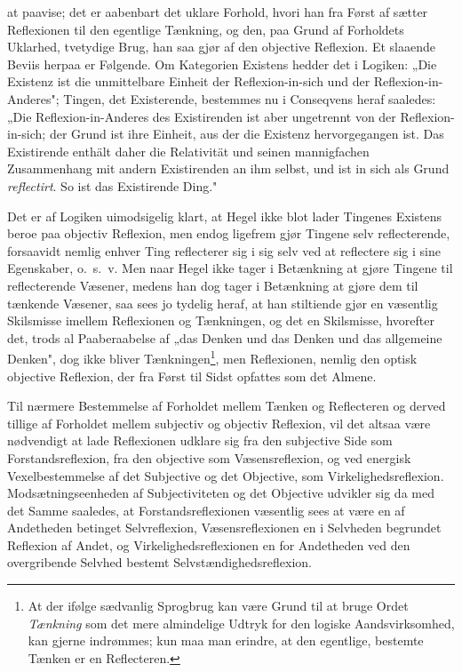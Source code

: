 \documentclass[12pt]{book}
\newcommand{\opage}[1]{\marginnote{\footnotesize\textit{[#1]}}}
\begin{document}
at paavise; det er aabenbart det uklare Forhold, hvori han fra Først af sætter
Reflexionen til den egentlige Tænkning, og den, paa Grund af Forholdets Uklarhed,
tvetydige Brug, han saa gjør af den objective Reflexion. Et slaaende Beviis herpaa
er Følgende. Om Kategorien Existens hedder det
\opage{59} i Logiken: „Die Existenz ist die unmittelbare Einheit der Reflexion-in-sich und
der Reflexion-in-Anderes"; Tingen, det Existerende, bestemmes nu i Conseqvens
heraf saaledes: „Die Reflexion-in-Anderes des Existirenden ist aber ungetrennt von
der Reflexion-in-sich; der Grund ist ihre Einheit, aus der die Existenz
hervorgegangen ist. Das Existirende enthält daher die Relativität und seinen
mannigfachen Zusammenhang mit andern Existirenden an ihm selbst, und ist in sich
als Grund \emph{reflectirt}. So ist das Existirende Ding."

Det er af Logiken uimodsigelig klart, at Hegel ikke blot lader Tingenes Existens
beroe paa objectiv Reflexion, men endog ligefrem gjør Tingene selv reflecterende,
forsaavidt nemlig enhver Ting reflecterer sig i sig selv ved at reflectere sig i
sine Egenskaber, o.~s.~v. Men naar Hegel ikke tager i Betænkning at gjøre Tingene
til reflecterende Væsener, medens han dog tager i Betænkning at gjøre dem til
tænkende Væsener, saa sees jo tydelig heraf, at han stiltiende gjør en væsentlig
Skilsmisse imellem Reflexionen og Tænkningen, og det en Skilsmisse, hvorefter det,
trods al Paaberaabelse af „das Denken und das Denken und das allgemeine Denken",
dog ikke bliver Tænkningen\footnote{At der ifølge sædvanlig Sprogbrug kan være
Grund til at bruge Ordet \emph{Tænkning} som det mere almindelige Udtryk for den
logiske Aandsvirksomhed, kan gjerne indrømmes; kun maa man erindre, at den
egentlige, bestemte Tænken er en Reflecteren.}, men Reflexionen, nemlig den optisk
objective Reflexion, der fra Først til Sidst opfattes som det Almene.

Til nærmere Bestemmelse af Forholdet mellem Tænken og Reflecteren og derved
tillige af Forholdet mellem subjectiv og objectiv Reflexion, vil det altsaa være
nødvendigt at lade Reflexionen udklare sig fra den subjective Side som
Forstandsreflexion, fra den objective som Væsensreflexion, og ved energisk
Vexelbestemmelse af det Subjective og det
\opage{60} Objective, som Virkelighedsreflexion. Modsætningseenheden af Subjectiviteten og
det Objective udvikler sig da med det Samme saaledes, at Forstandsreflexionen
væsentlig sees at være en af Andetheden betinget Selvreflexion, Væsensreflexionen
en i Selvheden begrundet Reflexion af Andet, og Virkelighedsreflexionen en for
Andetheden ved den overgribende Selvhed bestemt Selvstændighedsreflexion.
\end{document}
